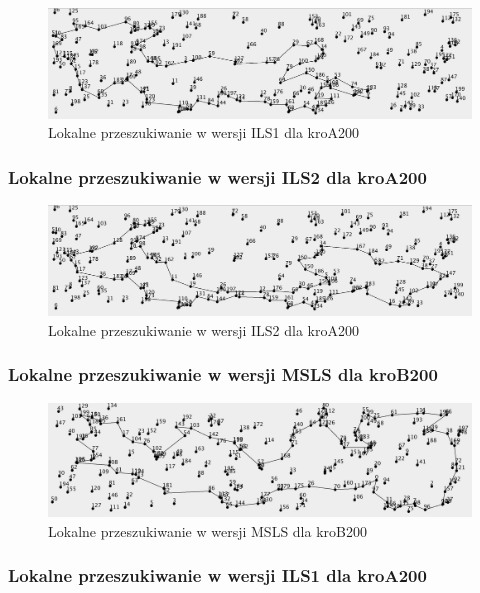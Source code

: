 \documentclass[a4paper]{article}
\begin{document}
\begin{figure}[H]
\centering
\includegraphics[width=\textwidth]{lab4/kroA_ILS1.png}
\caption{Lokalne przeszukiwanie w wersji ILS1 dla kroA200}
\end{figure}

\subsubsection{Lokalne przeszukiwanie w wersji ILS2 dla kroA200}

\begin{figure}[H]
\centering
\includegraphics[width=\textwidth]{lab4/kroA_ILS2.png}
\caption{Lokalne przeszukiwanie w wersji ILS2 dla kroA200}
\end{figure}

\subsubsection{Lokalne przeszukiwanie w wersji MSLS dla kroB200}

\begin{figure}[H]
\centering
\includegraphics[width=\textwidth]{lab4/kroB_MSLS.png}
\caption{Lokalne przeszukiwanie w wersji MSLS dla kroB200}
\end{figure}

\subsubsection{Lokalne przeszukiwanie w wersji ILS1 dla kroA200}
\end{document}
